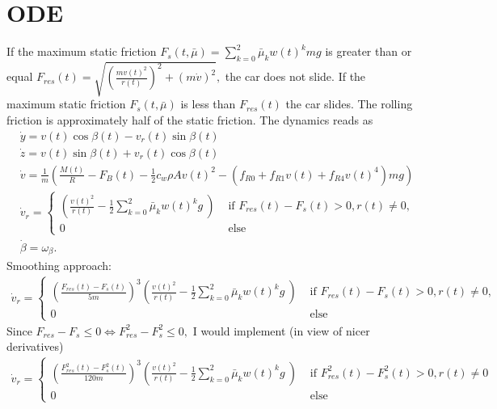 \documentclass[
10pt, %
a4paper, %
oneside, %
headinclude,footinclude, %
BCOR5mm, %
]{scrartcl}
\begin{document}
\section{ODE}
If the maximum static friction $F_s(t, \bar{\mu}) = \sum_{k=0}^2 \bar{\mu}_k w(t)^k mg $ is greater than or equal $F_{res}(t) = \sqrt{\left(\frac{mv(t)^2}{r(t)}\right)^2+ \left(m \dot{v}\right)^2},$ the car does not slide. 
If the maximum static friction $F_s(t, \bar{\mu})$ is less than $F_{res}(t)$ the car slides. The rolling friction is approximately half of the static friction.
The dynamics reads as
\begin{align*}
 &\dot{y} = v(t) \cos\beta(t) -  v_r(t)\sin \beta(t) \\
& \dot{z} = v(t) \sin\beta(t) +  v_r(t)\cos \beta(t) \\
& \dot{v} = \frac{1}{m}\left( \frac{M(t)}{R} - F_B(t) - \frac{1}{2}  c_w  \rho  A v(t)^2 -\left(f_{R0} + f_{R1} v(t) + f_{R4}v(t)^4 \right) m g\right)\\
& \dot{v}_r = \begin{cases} \left( \frac{v(t)^2}{r(t)}  -  \frac{1}{2} \sum_{k=0}^2 \bar{\mu}_k w(t)^k   g\ \right) & \text{ if } F_{res}(t)- F_{s}(t) > 0, r(t) \neq 0, \\
0 &   \text{ else }
\end{cases}\\
& \dot{\beta} = \omega_{\beta}.
\end{align*}
Smoothing approach:
\begin{align*}
 \dot{v}_r = \begin{cases} \left(\frac{F_{res}(t)- F_{s}(t)}{5m}\right)^3\left( \frac{v(t)^2}{r(t)}  -  \frac{1}{2} \sum_{k=0}^2 \bar{\mu}_k w(t)^k   g\ \right) & \text{ if } F_{res}(t)- F_{s}(t) > 0, r(t) \neq 0,\\
0 &   \text{ else }
\end{cases}
\end{align*}
Since $F_{res} - F_s \leq 0 \Leftrightarrow F_{res}^2 - F_s^2 \leq 0 ,$ I would implement (in view of nicer derivatives)
\begin{align*}
 \dot{v}_r = \begin{cases} \left(\frac{F_{res}^2(t)- F_{s}^2(t)}{120m}\right)^3\left( \frac{v(t)^2}{r(t)}  -  \frac{1}{2} \sum_{k=0}^2 \bar{\mu}_k w(t)^k   g\ \right) & \text{ if } F_{res}^2(t)- F_{s}^2(t) > 0, r(t) \neq 0\\
0 &   \text{ else }
\end{cases}
\end{align*}
\end{document}
